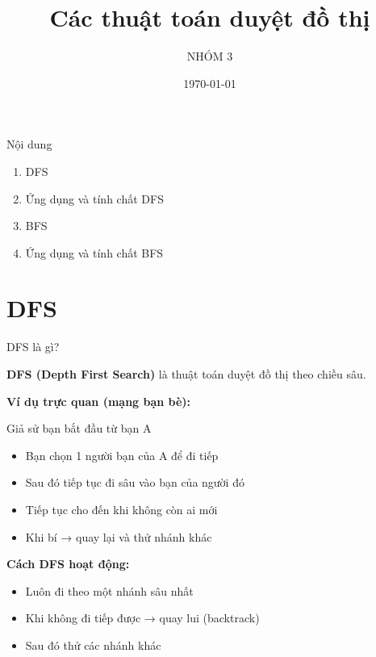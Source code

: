 \documentclass{beamer}
\title{Các thuật toán duyệt đồ thị}
\author{NHÓM 3}
\date{\today}
\newcommand{\hlblue}[1]{\textcolor{myblue}{#1}}
\newcommand{\hlgreen}[1]{\textcolor{mygreen}{#1}}
\newcommand{\hlred}[1]{\textcolor{myred}{#1}}
\newcommand{\hlorange}[1]{\textcolor{myorange}{#1}}
\begin{document}
\frame{\titlepage}

\begin{frame}{Nội dung}
\begin{enumerate}
\item DFS
\item Ứng dụng và tính chất DFS
\item BFS
\item Ứng dụng và tính chất BFS
\end{enumerate}
\end{frame}

\section{DFS}

\begin{frame}{DFS là gì?}

\textbf{DFS (Depth First Search)} là thuật toán duyệt đồ thị theo \hlblue{chiều sâu}.

\vspace{6pt}

\textbf{Ví dụ trực quan (mạng bạn bè):}

Giả sử bạn bắt đầu từ \hlred{bạn A}

\begin{itemize}
\item Bạn chọn 1 người bạn của A để đi tiếp
\item Sau đó tiếp tục đi sâu vào bạn của người đó
\item Tiếp tục cho đến khi không còn ai mới
\item Khi bí → quay lại và thử nhánh khác
\end{itemize}

\vspace{6pt}

\textbf{Cách DFS hoạt động:}
\begin{itemize}
\item Luôn đi theo \hlgreen{một nhánh sâu nhất}
\item Khi không đi tiếp được → \hlorange{quay lui (backtrack)}
\item Sau đó thử các nhánh khác
\end{itemize}

\end{frame}
\end{document}
